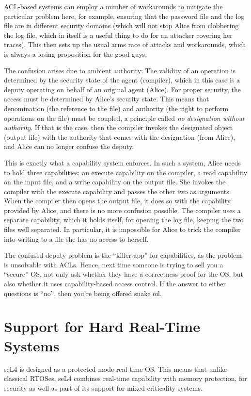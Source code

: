 \documentclass[english,a4paper,12pt]{report}
\newcommand{\Sect}[1]{\section{#1}}
\newcommand{\Sect}[1]{\chapter{#1}}
\begin{document}
  ACL-based systems can employ a number of workarounds to mitigate the
  particular problem here, for example, ensuring that the password
  file and the log file are in different security domains (which will
  not stop Alice from clobbering the log file, which in itself is a
  useful thing to do for an attacker covering her traces). This then
  sets up the usual arms race of attacks and workarounds, which is
  always a losing proposition for the good guys.

  The confusion arises due to ambient authority: The validity of
  an operation is determined by the security state of the agent
  (compiler), which in this case is a deputy operating on behalf of an
  original agent (Alice). For proper security, the access must be
  determined by Alice's security state. This means that denomination
  (the reference to the file) and authority (the right to perform
  operations on the file) must be coupled, a principle called \emph{no
    designation without authority}. If that is the case, then the
  compiler invokes the designated object (output file) with the
  authority that comes with the designation (from Alice), and Alice
  can no longer confuse the deputy.

  This is exactly what a capability system enforces. In such a system,
  Alice needs to hold three capabilities: an execute capability on the
  compiler, a read capability on the input file, and a write
  capability on the output file. She invokes the compiler with the
  execute capability and passes the other two as arguments. When the
  compiler then opens the output file, it does so with the capability
  provided by Alice, and there is no more confusion possible. The
  compiler uses a separate capability, which it holds itself, for
  opening the log file, keeping the two files well separated. In
  particular, it is impossible for Alice to trick the compiler into
  writing to a file she has no access to herself.

  The confused deputy problem is the ``killer app'' for capabilities,
  as the problem is unsolvable with ACLs. Hence, next time someone is
  trying to sell you a ``secure'' OS, not only ask whether they have
  a correctness proof for the OS, but also whether it uses
  capability-based access control. If the answer to either questions
  is ``no'', then you're being offered snake oil.

  \Sect{Support for Hard Real-Time Systems}\label{s:rtos}

  seL4 is designed as a protected-mode real-time OS. This means that
  unlike classical RTOSes, seL4 combines real-time capability with
  memory protection, for security as well as part of its support for
  mixed-criticality systems.
\end{document}
